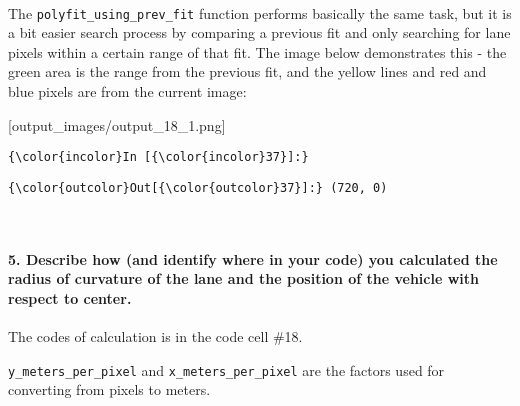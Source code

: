 \documentclass[11pt]{article}
\begin{document}
    \begin{center}
    \end{center}
    { \hspace*{\fill} \\}
    
    The \texttt{polyfit\_using\_prev\_fit} function performs basically the
same task, but it is a bit easier search process by comparing a previous
fit and only searching for lane pixels within a certain range of that
fit. The image below demonstrates this - the green area is the range
from the previous fit, and the yellow lines and red and blue pixels are
from the current image:

{[}output\_images/output\_18\_1.png{]}

    \begin{Verbatim}[commandchars=\\\{\}]
{\color{incolor}In [{\color{incolor}37}]:} 
\end{Verbatim}


\begin{Verbatim}[commandchars=\\\{\}]
{\color{outcolor}Out[{\color{outcolor}37}]:} (720, 0)
\end{Verbatim}
            
    \begin{center}
    \end{center}
    { \hspace*{\fill} \\}
    
    \hypertarget{describe-how-and-identify-where-in-your-code-you-calculated-the-radius-of-curvature-of-the-lane-and-the-position-of-the-vehicle-with-respect-to-center.}{%
\paragraph{5. Describe how (and identify where in your code) you
calculated the radius of curvature of the lane and the position of the
vehicle with respect to
center.}\label{describe-how-and-identify-where-in-your-code-you-calculated-the-radius-of-curvature-of-the-lane-and-the-position-of-the-vehicle-with-respect-to-center.}}

The codes of calculation is in the code cell \#18.

\texttt{y\_meters\_per\_pixel} and \texttt{x\_meters\_per\_pixel} are
the factors used for converting from pixels to meters.
\end{document}
